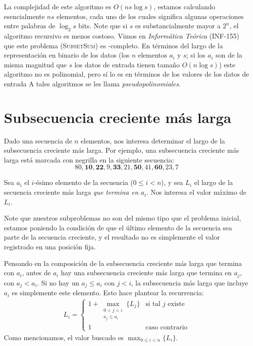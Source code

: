   La complejidad de este algoritmo es \(O(n s \log s)\),
  estamos calculando esencialmente \(n s\) elementos,
  cada uno de los cuales significa algunas operaciones
  entre palabras de \(\log_2 s\) bits.
  Note que si \(s\) es substancialmente mayor a \(2^n\),
  el algoritmo recursivo es menos costoso.
  Vimos en \emph{Informática Teórica} (INF-155) que este problema
  (\textsc{SubsetSum})
  es \NP\nobreakdash-completo.
  En términos del largo de la representación en binario de los datos
  (los \(n\) elementos \(a_i\) y \(s\);
   si los \(a_i\) son de la misma magnitud que \(s\)
   los datos de entrada tienen tamaño \(O(n \log s)\))
  este algoritmo no es polinomial,
  pero sí lo es en términos de los valores de los datos de entrada
  A tales algoritmos se les llama \emph{pseudopolinomiales}.

\section{Subsecuencia creciente más larga}
\label{sec:LIS}

  Dado una secuencia de \(n\) elementos,
  nos interesa determinar el largo de la subsecuencia creciente más larga.
  Por ejemplo,
  una subsecuencia creciente más larga está marcada con negrilla
  en la siguiente secuencia:
  \begin{equation*}
    80, \mathbf{10}, \mathbf{22}, 9, \mathbf{33}, 21, \mathbf{50},
    41, \mathbf{60}, 23, 7
  \end{equation*}

  Sea \(a_i\) el \(i\)\nobreakdash-ésimo elemento de la secuencia
  (\(0 \le i < n\)),
  y sea \(L_i\) el largo de la secuencia creciente más larga
  \emph{que termina en \(a_i\)}.
  Nos interesa el valor máximo de \(L_i\).

  Note que nuestros subproblemas no son del mismo tipo que el problema inicial,
  estamos poniendo la condición de que el último elemento de la secuencia
  sea parte de la secuencia creciente,
  y el resultado no es simplemente el valor registrado en una posición fija.

  Pensando en la composición de la subsecuencia creciente más larga
  que termina con \(a_i\),
  antes de \(a_i\) hay una subsecuencia creciente más larga
  que termina en \(a_j\),
  con \(a_j < a_i\).
  Si no hay un \(a_j \le a_i\) con \(j < i\),
  la subsecuencia más larga que incluye \(a_i\) es simplemente este elemento.
  Esto hace plantear la recurrencia:
  \begin{align}
    L_i
      = \begin{cases}
	   1 + \max_{\substack{ 0 < j < i \\
				a_j \le a_i }} \{ L_j \}
		& \text{si tal \(j\) existe} \\
	   1
		& \text{caso contrario}
	\end{cases}
  \end{align}
  Como mencionamos,
  el valor buscado es \(\max_{0 \le i < n} \{ L_i \}\).

